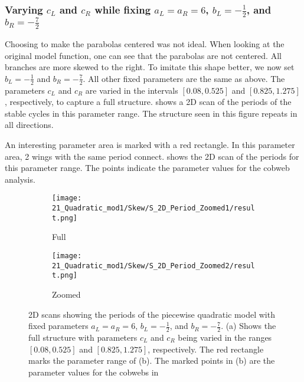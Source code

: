 \subsubsection{Varying $c_L$ and $c_R$ while fixing $a_L = a_R = 6$, $b_L = -\frac{1}{2}$, and $b_R = -\frac{7}{2}$}

Choosing to make the parabolas centered was not ideal.
When looking at the original model function, one can see that the parabolas are not centered.
All branches are more skewed to the right.
To imitate this shape better, we now set $b_L = -\frac{1}{2}$ and $b_R = -\frac{7}{2}$.
All other fixed parameters are the same as above.
The parameters $c_L$ and $c_R$ are varied in the intervals $[0.08, 0.525]$ and $[0.825, 1.275]$, respectively, to capture a full structure.
 shows a 2D scan of the periods of the stable cycles in this parameter range.
The structure seen in this figure repeats in all directions.

An interesting parameter area is marked with a red rectangle.
In this parameter area, 2 wings with the same period connect.
 shows the 2D scan of the periods for this parameter range.
The points indicate the parameter values for the cobweb analysis.

\begin{figure}
	\centering
	\begin{subfigure}{0.4\textwidth}
		\centering
		\texttt{[image: 21\_Quadratic\_mod1/Skew/S\_2D\_Period\_Zoomed1/result.png]}
		\caption{Full}
		\label{fig:setup.quad.skew.period.full}
	\end{subfigure}
	\begin{subfigure}{0.4\textwidth}
		\texttt{[image: 21\_Quadratic\_mod1/Skew/S\_2D\_Period\_Zoomed2/result.png]}
		\caption{Zoomed}
		\label{fig:setup.quad.skew.period.zoomed}
	\end{subfigure}
	\caption[2D scans showing periods of the skewed piecewise quadratic model]{
		2D scans showing the periods of the piecewise quadratic model with fixed parameters $a_L = a_R = 6$, $b_L = -\frac{1}{2}$, and $b_R = -\frac{7}{2}$.
		(a) Shows the full structure with parameters $c_L$ and $c_R$ being varied in the ranges $[0.08, 0.525]$ and $[0.825, 1.275]$, respectively.
		The red rectangle marks the parameter range of (b).
		The marked points in (b) are the parameter values for the cobwebs in 
	}
	\label{fig:setup.quad.skew.period}
\end{figure}

